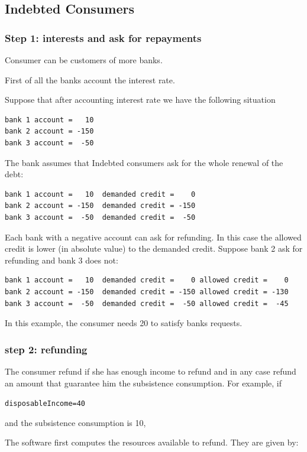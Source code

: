 \documentclass{article}
\begin{document}
\subsection{Indebted Consumers}
\subsubsection*{Step 1: interests and ask for repayments}

Consumer can be customers of more banks.

First of all the banks account the interest rate.

Suppose that after accounting interest rate we have the following situation
\begin{verbatim}
bank 1 account =   10
bank 2 account = -150
bank 3 account =  -50
\end{verbatim}

The bank assumes that Indebted consumers ask for the whole renewal of the debt:

\begin{verbatim}
bank 1 account =   10  demanded credit =    0
bank 2 account = -150  demanded credit = -150
bank 3 account =  -50  demanded credit =  -50
\end{verbatim}

Each bank with a negative account can ask for refunding. In this case the allowed credit is lower (in absolute value) to the demanded credit.
Suppose bank 2 ask for refunding and bank 3 does not:

\begin{verbatim}
bank 1 account =   10  demanded credit =    0 allowed credit =    0
bank 2 account = -150  demanded credit = -150 allowed credit = -130 
bank 3 account =  -50  demanded credit =  -50 allowed credit =  -45
\end{verbatim}

In this example, the consumer needs 20 to satisfy banks requests.

\subsubsection*{step 2: refunding}
The consumer refund if she has enough income to refund and in any case refund an amount that guarantee him the subsistence consumption. For example, if 

\verb+disposableIncome=40+

and the subsistence consumption is 10,

The software first computes the resources available to refund. They are given by:
\end{document}
